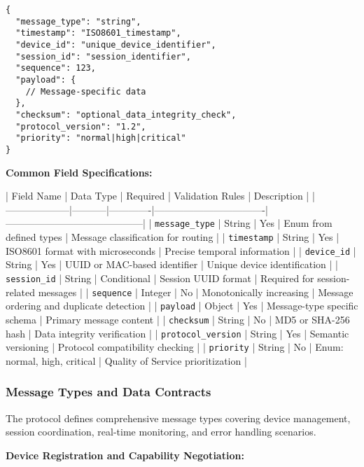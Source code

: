 \documentclass[11pt,a4paper]{article}
\begin{document}
\begin{verbatim}
{
  "message_type": "string",
  "timestamp": "ISO8601_timestamp",
  "device_id": "unique_device_identifier",
  "session_id": "session_identifier",
  "sequence": 123,
  "payload": {
    // Message-specific data
  },
  "checksum": "optional_data_integrity_check",
  "protocol_version": "1.2",
  "priority": "normal|high|critical"
}
\end{verbatim}

\textbf{Common Field Specifications:}

| Field Name         | Data Type | Required    | Validation Rules                 | Description                              |
|--------------------|-----------|-------------|----------------------------------|------------------------------------------|
| \texttt{message\_type}     | String    | Yes         | Enum from defined types          | Message classification for routing       |
| \texttt{timestamp}        | String    | Yes         | ISO8601 format with microseconds | Precise temporal information             |
| \texttt{device\_id}        | String    | Yes         | UUID or MAC-based identifier     | Unique device identification             |
| \texttt{session\_id}       | String    | Conditional | Session UUID format              | Required for session-related messages    |
| \texttt{sequence}         | Integer   | No          | Monotonically increasing         | Message ordering and duplicate detection |
| \texttt{payload}          | Object    | Yes         | Message-type specific schema     | Primary message content                  |
| \texttt{checksum}         | String    | No          | MD5 or SHA-256 hash              | Data integrity verification              |
| \texttt{protocol\_version} | String    | Yes         | Semantic versioning              | Protocol compatibility checking          |
| \texttt{priority}         | String    | No          | Enum: normal, high, critical     | Quality of Service prioritization        |

\subsubsection{Message Types and Data Contracts}

The protocol defines comprehensive message types covering device management, session coordination, real-time monitoring,
and error handling scenarios.

\textbf{Device Registration and Capability Negotiation:}
\end{document}
